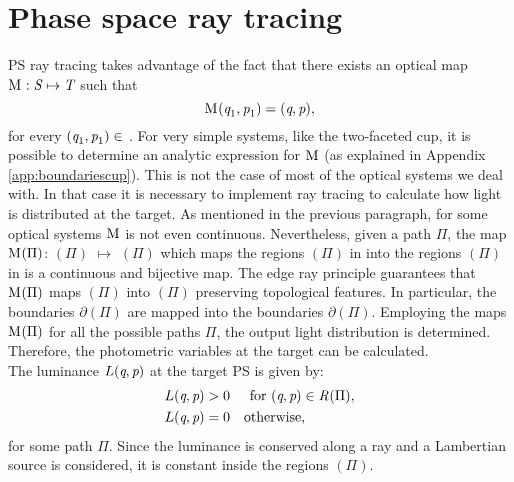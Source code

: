 \section{Phase space ray tracing}
PS ray tracing takes advantage of the fact that there exists an optical map
$
\mathrm{M}_{\textit{}}: \mbox{$\emph{S}_{\textit{}}$} \mapsto \mbox{$\emph{T}_{\textit{}}$}
$
 such that
\begin{equation}
\mathrm{M}_{\textit{}}(\textit{q}_1,\textit{p}_1)=(\textit{q},\textit{p}),
\end{equation} for every $(\textit{q}_1,\textit{p}_1)\in$ .
For very simple systems, like the two-faceted cup, it is possible to determine an analytic expression for $\mathrm{M}_{\textit{}}$ (as explained in Appendix \ref{app:boundariescup}).
This is not the case of most of the optical systems we deal with. In that case it is necessary to implement ray tracing to calculate how light is distributed at the target.
As mentioned in the previous paragraph, for some optical systems $\mathrm{M}_{\textit{}}$ is not even continuous.
Nevertheless, given a path $\Pi$, the map $\mathrm{M}_{\textit{}}(\Pi)$: $(\Pi)$ $\mapsto$ $(\Pi)$
which maps the regions $(\Pi)$ in  into the regions $(\Pi)$ in  is a continuous and bijective map.
  The edge ray principle guarantees that $\mathrm{M}_{\textit{}}(\Pi)$ maps $(\Pi)$ into $(\Pi)$ preserving topological features. In particular, the boundaries $\partial$$(\Pi)$ are mapped into the boundaries $\partial$$(\Pi)$. %
Employing the maps $\mathrm{M}_{\textit{}}(\Pi)$ for all the possible paths $\Pi$, the output light distribution is determined. Therefore, the photometric variables at the target can be calculated.
\\ \indent The luminance $L(\textit{q}, \textit{p})$ at the target PS is given by:
\begin{equation}
\begin{aligned}
\label{eq:PSluminance}
L(\variabile{q}, \variabile{p}) &> 0 & \mbox{for } (\variabile{q}, \variabile{p})\in \mbox{\set{R}{}{}}(\Pi),\\ \vspace{0.5 cm}
L(\variabile{q}, \variabile{p}) &= 0 & \mbox{otherwise},\qquad \quad \;\;
\end{aligned}
\end{equation}
for some path $\Pi$. Since the luminance is conserved along a ray and a Lambertian source is considered, it is constant inside the regions $(\Pi)$.
